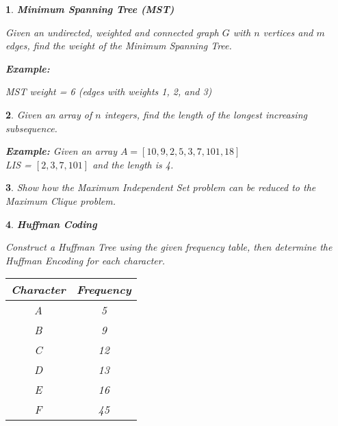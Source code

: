 \documentclass[%
addpoints]{exam}
\theoremstyle{problem}
\newtheorem{p}{}
\begin{document}
\begin{p}
\textbf{Minimum Spanning Tree (MST)}

Given an undirected, weighted and connected graph $G$ with $n$ vertices and $m$ edges, find the weight of the Minimum Spanning Tree.

\textbf{Example:}
\begin{center}
\end{center}

MST weight = 6 (edges with weights 1, 2, and 3)
\hfill \end{p}

\begin{p}
Given an array of $n$ integers, find the length of the longest increasing subsequence.

\textbf{Example:}
Given an array $A = [ 10, 9, 2, 5, 3, 7, 101, 18 ]$\\
LIS = $[ 2, 3, 7, 101 ]$ and the length is 4.
\hfill \end{p}

\begin{p}
Show how the Maximum Independent Set problem can be reduced to the Maximum Clique problem.
\hfill \end{p}

\begin{p}
\textbf{Huffman Coding}

Construct a Huffman Tree using the given frequency table, then determine the Huffman Encoding for each character.

\begin{center}
\begin{tabular}{|c|c|}
\hline
\textbf{Character} & \textbf{Frequency} \\
\hline
A & 5 \\
B & 9 \\
C & 12 \\
D & 13 \\
E & 16 \\
F & 45 \\
\hline
\end{tabular}
\end{center}
\hfill \end{p}
\end{document}
